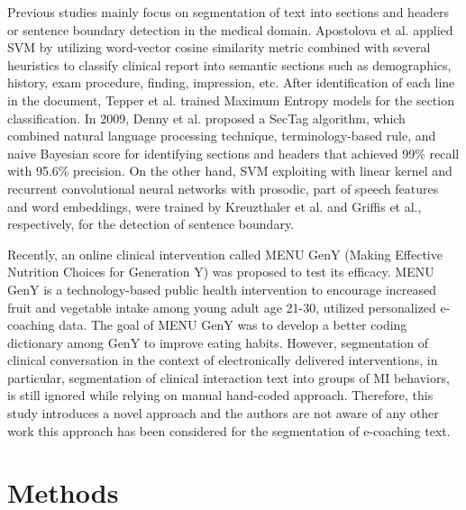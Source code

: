 \documentclass{amia}
\begin{document}
Previous studies mainly focus on segmentation of text into sections and headers\cite{apostolova2009automatic,denny2009evaluation,tepper2012statistical,cho2002text} or sentence boundary detection\cite{griffis2016quantitative,kreuzthaler2015detection,treviso2016sentence} in the medical domain. Apostolova et al.\cite{apostolova2009automatic} applied SVM by utilizing word-vector cosine similarity metric combined with several heuristics to classify clinical report into semantic sections such as demographics, history, exam procedure, finding, impression, etc. After identification of each line in the document, Tepper et al. \cite{tepper2012statistical} trained Maximum Entropy models for the section classification. In 2009, Denny et al.\cite{denny2009evaluation} proposed a SecTag algorithm, which combined natural language processing technique, terminology-based rule, and naive Bayesian score for identifying sections and headers that achieved 99\% recall with 95.6\% precision. On the other hand, SVM exploiting with linear kernel and recurrent convolutional neural networks with prosodic, part of speech features and word embeddings, were trained by Kreuzthaler et al.\cite{kreuzthaler2015detection} and Griffis et al.\cite{griffis2016quantitative}, respectively, for the detection of sentence boundary. 

Recently, an online clinical intervention called MENU GenY\cite{alexander2017motivations} (Making Effective Nutrition Choices for Generation Y) was proposed to test its efficacy. MENU GenY is a technology-based public health intervention to encourage increased fruit and vegetable intake among young adult age 21-30, utilized personalized e-coaching data. The goal of MENU GenY was to develop a better coding dictionary among GenY to improve eating habits. However, segmentation of clinical conversation in the context of electronically delivered interventions, in particular, segmentation of clinical interaction text into groups of MI behaviors, is still ignored while relying on manual hand-coded approach. Therefore, this study introduces a novel approach and the authors are not aware of any other work this approach has been considered for the segmentation of e-coaching text.  


\section*{Methods}
\end{document}
